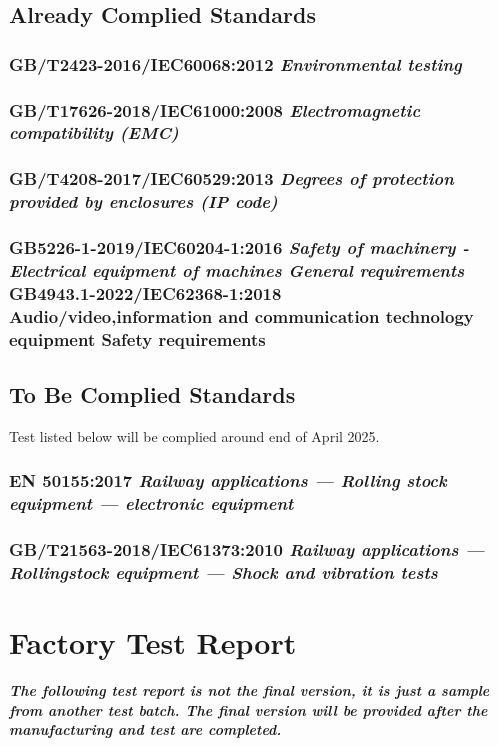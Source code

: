 \documentclass{article}
\begin{document}
\subsection{Already Complied Standards}
\subsubsection{GB/T2423-2016/IEC60068:2012 \textit {Environmental testing}}

\subsubsection{GB/T17626-2018/IEC61000:2008 \textit {Electromagnetic compatibility (EMC)}}

\subsubsection{GB/T4208-2017/IEC60529:2013 \textit {Degrees of protection provided by enclosures (IP code)}}

\subsubsection{GB5226-1-2019/IEC60204-1:2016 \textit {Safety of machinery - Electrical equipment of machines General requirements}\\GB4943.1-2022/IEC62368-1:2018 \\Audio/video,information and communication technology equipment Safety requirements}

\clearpage
\subsection{To Be Complied Standards}
Test listed below will be complied around end of April 2025.
\subsubsection{EN 50155:2017 \textit {Railway applications — Rolling stock equipment — electronic equipment}}

\subsubsection{GB/T21563-2018/IEC61373:2010 \textit {Railway applications — Rollingstock equipment — Shock and vibration tests}}
\clearpage
\section{Factory Test Report}

{\bfseries\emph{The following test report is not the final version, it is just a sample from another test batch. The final version will be provided after the manufacturing and test are completed.}}




\end{document}
